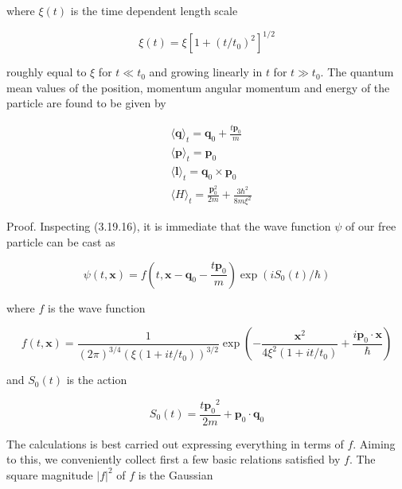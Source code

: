 \documentclass{article}
\begin{document}
where $\xi(t)$ is the time dependent length scale
 
\begin{equation*}
\xi(t)=\xi\left[1+\left(t / t_{0}\right)^{2}\right]^{1 / 2} \tag{3.19.22}
\end{equation*}
 
roughly equal to $\xi$ for $t \ll t_{0}$ and growing linearly in $t$ for $t \gg t_{0}$.
The quantum mean values of the position, momentum angular momentum and energy of the particle are found to be given by
 
\begin{align*}
& \langle\boldsymbol{q}\rangle_{t}=\boldsymbol{q}_{0}+\frac{t \boldsymbol{p}_{0}}{m}  \tag{3.19.23}\\
& \langle\boldsymbol{p}\rangle_{t}=\boldsymbol{p}_{0}  \tag{3.19.24}\\
& \langle\boldsymbol{l}\rangle_{t}=\boldsymbol{q}_{0} \times \boldsymbol{p}_{0}  \tag{3.19.25}\\
& \langle H\rangle_{t}=\frac{\boldsymbol{p}_{0}^{2}}{2 m}+\frac{3 \hbar^{2}}{8 m \xi^{2}} \tag{3.19.26}
\end{align*}
 

Proof. Inspecting (3.19.16), it is immediate that the wave function $\psi$ of our free particle can be cast as
 
\begin{equation*}
\psi(t, \boldsymbol{x})=f\left(t, \boldsymbol{x}-\boldsymbol{q}_{0}-\frac{t \boldsymbol{p}_{0}}{m}\right) \exp \left(i S_{0}(t) / \hbar\right) \tag{3.19.27}
\end{equation*}
 
where $f$ is the wave function
 
\begin{equation*}
f(t, \boldsymbol{x})=\frac{1}{(2 \pi)^{3 / 4}\left(\xi\left(1+i t / t_{0}\right)\right)^{3 / 2}} \exp \left(-\frac{\boldsymbol{x}^{2}}{4 \xi^{2}\left(1+i t / t_{0}\right)}+\frac{i \boldsymbol{p}_{0} \cdot \boldsymbol{x}}{\hbar}\right) \tag{3.19.28}
\end{equation*}
 
and $S_{0}(t)$ is the action
 
\begin{equation*}
S_{0}(t)=\frac{t \boldsymbol{p}_{0}{ }^{2}}{2 m}+\boldsymbol{p}_{0} \cdot \boldsymbol{q}_{0} \tag{3.19.29}
\end{equation*}
 

The calculations is best carried out expressing everything in terms of $f$. Aiming to this, we conveniently collect first a few basic relations satisfied by $f$. The square magnitude $|f|^{2}$ of $f$ is the Gaussian
 
\end{document}
